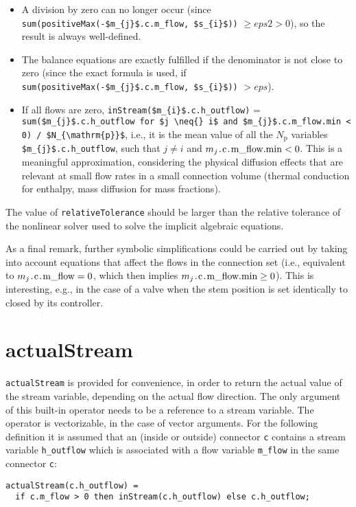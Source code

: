 \begin{nonnormative}
\begin{itemize}
\item
  A division by zero can no longer occur (since \lstinline!sum(positiveMax(-$m_{j}$.c.m_flow, $s_{i}$))! $\geq \mathit{eps2} > 0$), so the result is always well-defined.
\item
  The balance equations are exactly fulfilled if the denominator is not close to zero (since the exact formula is used, if \lstinline!sum(positiveMax(-$m_{j}$.c.m_flow, $s_{i}$))! $> \mathit{eps}$).
\item
  If all flows are zero, \lstinline!inStream($m_{i}$.c.h_outflow)! = \lstinline!sum($m_{j}$.c.h_outflow for $j \neq{} i$ and $m_{j}$.c.m_flow.min < 0) / $N_{\mathrm{p}}$!, i.e., it is the mean value of all the $N_{\mathrm{p}}$ variables \lstinline!$m_{j}$.c.h_outflow!, such that $j \neq i$ and $m_{j}\text{\lstinline!.c.m_flow.min!} < 0$.
  This is a meaningful approximation, considering the physical diffusion effects that are relevant at small flow rates in a small connection volume (thermal conduction for enthalpy, mass diffusion for mass fractions).
\end{itemize}

The value of \lstinline!relativeTolerance! should be larger than the relative tolerance of the nonlinear solver used to solve the implicit algebraic equations.

As a final remark, further symbolic simplifications could be carried out by taking into account equations that affect the flows in the connection set (i.e., equivalent to $m_{j}\text{\lstinline!.c.m_flow!} = 0$, which then implies $m_{j}\text{\lstinline!.c.m_flow.min!} \geq 0$).
This is interesting, e.g., in the case of a valve when the stem position is set identically to closed by its controller.
\end{nonnormative}

\section{actualStream}\label{stream-operator-actualstream}\label{actualstream}

\lstinline!actualStream! is provided for convenience, in order to return the actual value of the stream variable, depending on the actual flow direction.
The only argument of this built-in operator needs to be a reference to a stream variable.
The operator is vectorizable, in the case of vector arguments.
For the following definition it is assumed that an (inside or outside) connector \lstinline!c! contains a stream variable \lstinline!h_outflow! which is associated with a flow variable \lstinline!m_flow! in the same connector \lstinline!c!:
\begin{lstlisting}[language=modelica]
actualStream(c.h_outflow) =
  if c.m_flow > 0 then inStream(c.h_outflow) else c.h_outflow;
\end{lstlisting}

